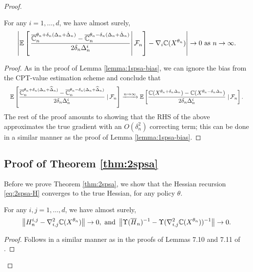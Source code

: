 \begin{proof}
\begin{lemma}
\label{lemma:2spsa-grad}
For any $i = 1,\ldots,d$, we have almost surely,  
\begin{align}
\left| \mathbb{E}\left[\left.\dfrac{\overline {\mathbb{C}}_n^{\theta_n + \delta_n (\Delta_n + \hat \Delta_n)} -\overline {\mathbb{C}}_n^{\theta_n - \delta_n (\Delta_n + \hat \Delta_n)}}{2 \delta_n \Delta_n^i}\right| \mathcal{F}_n \right] - \nabla_i \mathbb{C}(X^{\theta_n}) \right| \rightarrow 0 \text{ as } n\rightarrow\infty.
\end{align} 
\end{lemma}
\begin{proof}
As in the proof of Lemma \ref{lemma:1spsa-bias}, we can ignore the bias from the CPT-value estimation scheme and conclude that
\begin{align*}
\quad&\mathbb{E}\left[\dfrac{\overline {\mathbb{C}}_n^{\theta_n + \delta_n (\Delta_n+\widehat\Delta_n)} -\overline {\mathbb{C}}_n^{\theta_n - \delta_n (\Delta_n+\widehat\Delta_n)}}{2 \delta_n \Delta_n^i} \left.\right| \mathcal{F}_n\right] 
\xrightarrow{n\rightarrow\infty}  \mathbb{E}\left[\dfrac{\mathbb{C}(X^{\theta_n + \delta_n \Delta_n}) -\mathbb{C}(X^{\theta_n - \delta_n \Delta_n})}{2 \delta_n \Delta_n^i} \left.\right| \mathcal{F}_n\right].  
\end{align*}
The rest of the proof amounts to showing that the RHS of the above approximates the true gradient with an $O(\delta_n^2)$ correcting term; this can be done in a similar manner as the proof of Lemma \ref{lemma:1spsa-bias}.
\end{proof}

\subsection*{Proof of Theorem \ref{thm:2spsa}}

Before we prove Theorem \ref{thm:2spsa}, we show that the Hessian recursion \eqref{eq:2spsa-H} converges to the true Hessian, for any policy $\theta$.

\begin{lemma}
\label{lemma:h-est}
For any $i, j= 1,\ldots,d$, we have almost surely,  
$$\left \| H^{i, j}_n - \nabla^2_{i,j} \mathbb{C}(X^{\theta_n}) \right \| \rightarrow 0,
\text{ and }\left \| \Upsilon(\overline H_n)^{-1} - \Upsilon(\nabla^2_{i,j} \mathbb{C}(X^{\theta_n}))^{-1} \right \| \rightarrow 0.
$$
\end{lemma}
\begin{proof}
 Follows in a similar manner as in the proofs of Lemmas 7.10 and 7.11 of \cite{Bhatnagar13SR}.
\end{proof}


\end{proof}
